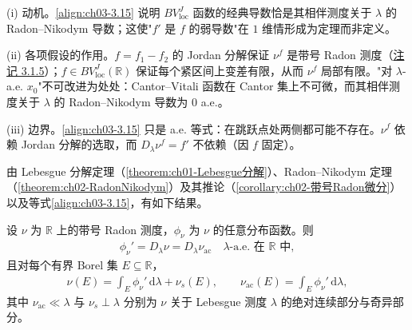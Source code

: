 \documentclass[../../main.tex]{subfiles}%
\begin{document}
\begin{remark}\label{remark:ch03-RN导数动机}
(i) 动机。\eqref{align:ch03-3.15} 说明 $BV^J_{\mathrm{loc}}$ 函数的经典导数恰是其相伴测度关于 $\lambda$ 的 Radon--Nikodym 导数；这使"$f'$ 是 $f$ 的弱导数"在 $1$ 维情形成为定理而非定义。

(ii) 各项假设的作用。$f=f_1-f_2$ 的 Jordan 分解保证 $\nu^f$ 是带号 Radon 测度（\hyperref[remark:ch03-Stieltjes]{注记 3.1.5}）；$f\in BV^J_{\mathrm{loc}}(\mathbb{R})$ 保证每个紧区间上变差有限，从而 $\nu^f$ 局部有限。"对 $\lambda$-a.e. $x_0$"不可改进为处处：Cantor--Vitali 函数在 Cantor 集上不可微，而其相伴测度关于 $\lambda$ 的 Radon--Nikodym 导数为 $0$ a.e.。

(iii) 边界。\eqref{align:ch03-3.15} 只是 a.e. 等式：在跳跃点处两侧都可能不存在。$\nu^f$ 依赖 Jordan 分解的选取，而 $D_\lambda\nu^f=f'$ 不依赖（因 $f$ 固定）。
\end{remark}

由 Lebesgue 分解定理（\cref{theorem:ch01-Lebesgue分解}）、Radon--Nikodym 定理（\cref{theorem:ch02-RadonNikodym}）及其推论（\cref{corollary:ch02-带号Radon微分}）以及等式\eqref{align:ch03-3.15}，有如下结果。

\begin{theorem}\label{theorem:ch03-Lebesgue分解1D}
设 $\nu$ 为 $\mathbb{R}$ 上的带号 Radon 测度，$\phi_\nu$ 为 $\nu$ 的任意分布函数。则
\begin{align}
\phi_\nu'=D_\lambda\nu=D_\lambda\nu_{\mathrm{ac}}\quad \lambda\text{-a.e. 在 }\mathbb{R}\text{ 中},\label{align:ch03-3.16}
\end{align}
且对每个有界 Borel 集 $E\subseteq\mathbb{R}$，
\begin{align}
\nu(E)=\int_E\phi_\nu'\,\mathrm{d}\lambda+\nu_s(E),\qquad
\nu_{\mathrm{ac}}(E)=\int_E\phi_\nu'\,\mathrm{d}\lambda,\label{align:ch03-3.17}
\end{align}
其中 $\nu_{\mathrm{ac}}\ll\lambda$ 与 $\nu_s\perp\lambda$ 分别为 $\nu$ 关于 Lebesgue 测度 $\lambda$ 的绝对连续部分与奇异部分。
\end{theorem}
\end{document}
